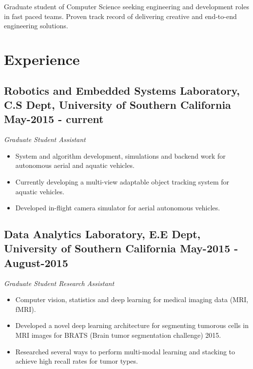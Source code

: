 \documentclass[10pt,letterpaper,sans]{moderncv}        %
\begin{document}
\pagestyle{empty}
\makecvtitle

\small{Graduate student of Computer Science seeking engineering and development roles in fast paced teams. Proven track record of delivering creative and end-to-end engineering solutions.}

\section{Experience}
\vspace{2pt}

\subsection{\textbf{Robotics and Embedded Systems Laboratory}, C.S Dept, University of Southern California \small{May-2015 - current}}
\textit{Graduate Student Assistant}\\
\begin {small}
\begin{itemize}
\item System and algorithm development, simulations and backend work for autonomous aerial and aquatic vehicles.
\item Currently developing a multi-view adaptable object tracking system for aquatic vehicles.
\item Developed in-flight camera simulator for aerial autonomous vehicles.
\end{itemize}
\end{small}

\subsection{\textbf{Data Analytics Laboratory}, E.E Dept, University of Southern California \small{May-2015 - August-2015}}
\textit{Graduate Student Research Assistant}\\
\begin {small}
\begin {itemize}
\item Computer vision, statistics and deep learning for medical imaging data (MRI, fMRI).
\item Developed a novel deep learning architecture for segmenting tumorous cells in MRI images for BRATS (Brain tumor segmentation challenge) 2015.
\item Researched several ways to perform multi-modal learning and stacking to achieve high recall rates for tumor types.
\end {itemize}
\end{small}
\end{document}
